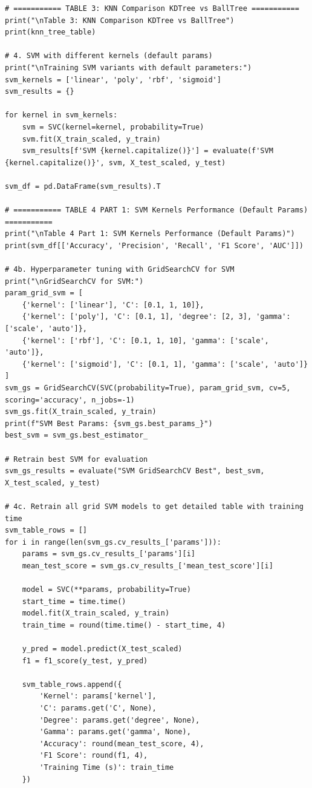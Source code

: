 \documentclass[12pt]{article}
\begin{document}
\begin{verbatim}
# =========== TABLE 3: KNN Comparison KDTree vs BallTree ===========
print("\nTable 3: KNN Comparison KDTree vs BallTree")
print(knn_tree_table)

# 4. SVM with different kernels (default params)
print("\nTraining SVM variants with default parameters:")
svm_kernels = ['linear', 'poly', 'rbf', 'sigmoid']
svm_results = {}

for kernel in svm_kernels:
    svm = SVC(kernel=kernel, probability=True)
    svm.fit(X_train_scaled, y_train)
    svm_results[f'SVM {kernel.capitalize()}'] = evaluate(f'SVM {kernel.capitalize()}', svm, X_test_scaled, y_test)

svm_df = pd.DataFrame(svm_results).T

# =========== TABLE 4 PART 1: SVM Kernels Performance (Default Params) ===========
print("\nTable 4 Part 1: SVM Kernels Performance (Default Params)")
print(svm_df[['Accuracy', 'Precision', 'Recall', 'F1 Score', 'AUC']])

# 4b. Hyperparameter tuning with GridSearchCV for SVM
print("\nGridSearchCV for SVM:")
param_grid_svm = [
    {'kernel': ['linear'], 'C': [0.1, 1, 10]},
    {'kernel': ['poly'], 'C': [0.1, 1], 'degree': [2, 3], 'gamma': ['scale', 'auto']},
    {'kernel': ['rbf'], 'C': [0.1, 1, 10], 'gamma': ['scale', 'auto']},
    {'kernel': ['sigmoid'], 'C': [0.1, 1], 'gamma': ['scale', 'auto']}
]
svm_gs = GridSearchCV(SVC(probability=True), param_grid_svm, cv=5, scoring='accuracy', n_jobs=-1)
svm_gs.fit(X_train_scaled, y_train)
print(f"SVM Best Params: {svm_gs.best_params_}")
best_svm = svm_gs.best_estimator_

# Retrain best SVM for evaluation
svm_gs_results = evaluate("SVM GridSearchCV Best", best_svm, X_test_scaled, y_test)

# 4c. Retrain all grid SVM models to get detailed table with training time
svm_table_rows = []
for i in range(len(svm_gs.cv_results_['params'])):
    params = svm_gs.cv_results_['params'][i]
    mean_test_score = svm_gs.cv_results_['mean_test_score'][i]

    model = SVC(**params, probability=True)
    start_time = time.time()
    model.fit(X_train_scaled, y_train)
    train_time = round(time.time() - start_time, 4)

    y_pred = model.predict(X_test_scaled)
    f1 = f1_score(y_test, y_pred)

    svm_table_rows.append({
        'Kernel': params['kernel'],
        'C': params.get('C', None),
        'Degree': params.get('degree', None),
        'Gamma': params.get('gamma', None),
        'Accuracy': round(mean_test_score, 4),
        'F1 Score': round(f1, 4),
        'Training Time (s)': train_time
    })


\end{verbatim}
\end{document}
